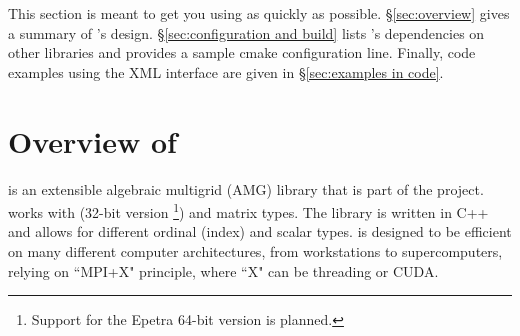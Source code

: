 This section is meant to get you using \muelu{} as quickly as possible.  \S\ref{sec:overview} gives a
summary of \muelu's design.  \S\ref{sec:configuration and build} lists \muelu's dependencies on other
\trilinos libraries and provides a sample cmake configuration line.  Finally, code examples using the XML
interface are given in \S\ref{sec:examples in code}.

\label{sec:overview}
\section{Overview of \muelu}
\muelu{} is an extensible algebraic multigrid (AMG) library that is part of the
\trilinos{} project. \muelu{} works with \epetra (32-bit version
\footnote{Support for the Epetra 64-bit version is planned.}) and
\tpetra matrix types. The library is written in C++ and allows for different
ordinal (index) and scalar types.  \muelu{} is designed to be efficient on many
different computer architectures, from workstations to supercomputers, relying
on ``MPI+X" principle, where ``X" can be threading or CUDA.

